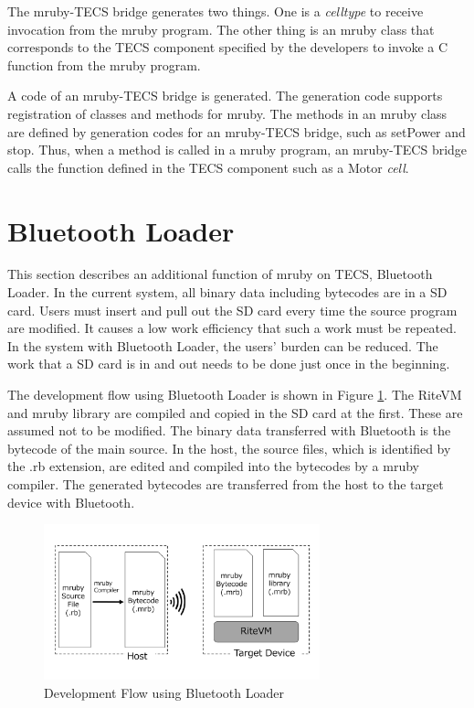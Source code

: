 \documentclass[conference,compsoc]{IEEEtran}
\begin{document}
The mruby-TECS bridge generates two things.
One is a {\it celltype} to receive invocation from the mruby program.
The other thing is an mruby class that corresponds to the TECS component specified by the developers to invoke a C function from the mruby program.

A code of an mruby-TECS bridge is generated.
The generation code supports registration of classes and methods for mruby.
The methods in an mruby class are defined by generation codes for an mruby-TECS bridge, such as setPower and stop.
Thus, when a method is called in a mruby program, an mruby-TECS bridge calls the function defined in the TECS component such as a Motor {\it cell}.

 
\section{Bluetooth Loader}
\label{sec:Bluetooth Loader}
This section describes an additional function of mruby on TECS, Bluetooth Loader.
In the current system, all binary data including bytecodes are in a SD card.
Users must insert and pull out the SD card every time the source program are modified.
It causes a low work efficiency that such a work must be repeated.
In the system with Bluetooth Loader, the users' burden can be reduced.
The work that a SD card is in and out needs to be done just once in the beginning.

The development flow using Bluetooth Loader is shown in Figure \ref{fig:bluetooth_loader}.
The RiteVM and mruby library are compiled and copied in the SD card at the first.
These are assumed not to be modified.
The binary data transferred with Bluetooth is the bytecode of the main source.
In the host, the source files, which is identified by the .rb extension, are edited and compiled into the bytecodes by a mruby compiler.
The generated bytecodes are transferred from the host to the target device with Bluetooth.

\begin{figure}[t]
    \centering
    \includegraphics[width=8cm,clip]{figure/bluetooth_loader.pdf}
    \caption{Development Flow using Bluetooth Loader}
    \label{fig:bluetooth_loader}
\end{figure}
\end{document}
